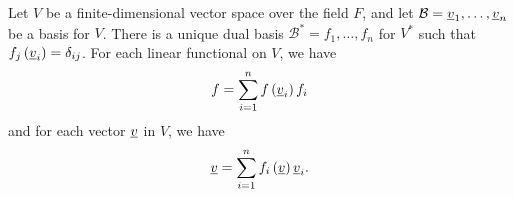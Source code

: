 
\begin{theorem}
Let $V$ be a finite-dimensional vector space over the field $F$, and let $\mathcal{B} = \underline{v}_1, \ldots, \underline{v}_n$ be a basis for $V$.
There is a unique dual basis $\mathcal{B}^* = f_1, \ldots, f_n$ for $V^*$ such that $f_j \left( \underline{v}_i \right) = \delta_{ij}$.
For each linear functional on $V$, we have
\begin{equation*}
f = \sum_{i=1}^n f \left( \underline{v}_i \right) f_i
\end{equation*}
and for each vector $\underline{v}$ in $V$, we have
\begin{equation*}
\underline{v} = \sum_{i=1}^n f_i \left( \underline{v} \right) \underline{v}_i .
\end{equation*}
\end{theorem}
